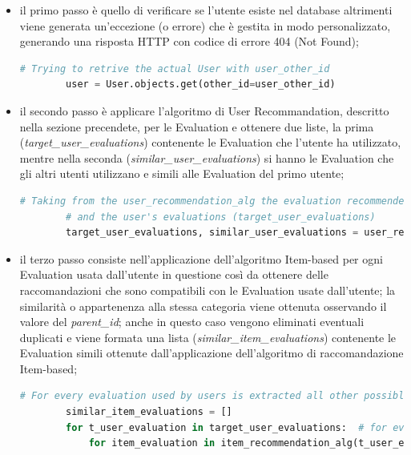 \begin{itemize}
    \item il primo passo è quello di verificare se l'utente esiste nel database altrimenti viene generata un’eccezione (o errore) che è gestita in 
    modo personalizzato, generando una risposta HTTP con codice di errore 404 (Not Found);
    \begin{lstlisting}[language=Python, label=lst:CF_Hybrid_Evaluation_2]
        # Trying to retrive the actual User with user_other_id
        user = User.objects.get(other_id=user_other_id)
    \end{lstlisting} 
    \item il secondo passo è applicare l'algoritmo di User Recommandation, descritto nella sezione precendete, per le Evaluation e ottenere due liste, 
    la prima (\textit{target\_user\_evaluations}) contenente le Evaluation che l'utente ha utilizzato, mentre nella seconda (\textit{similar\_user\_evaluations}) 
    si hanno le Evaluation che gli altri utenti utilizzano e simili alle Evaluation del primo utente;
    \begin{lstlisting}[language=Python, label=lst:CF_Hybrid_Evaluation_3]
        # Taking from the user_recommendation_alg the evaluation recommended from this approach (similar_user_evaluations)
        # and the user's evaluations (target_user_evaluations)
        target_user_evaluations, similar_user_evaluations = user_recommendation_alg(user_other_id)
    \end{lstlisting} 
    \item il terzo passo consiste nell'applicazione dell'algoritmo Item-based per ogni Evaluation usata dall'utente in questione così da ottenere 
    delle raccomandazioni che sono compatibili con le Evaluation usate dall'utente; la similarità o appartenenza alla stessa categoria viene 
    ottenuta osservando il valore del \textit{parent\_id}; anche in questo caso vengono eliminati eventuali duplicati e viene formata una lista 
    (\textit{similar\_item\_evaluations}) contenente le Evaluation simili ottenute dall'applicazione dell'algoritmo di raccomandazione Item-based;
    \begin{lstlisting}[language=Python, label=lst:CF_Hybrid_Evaluation_4]
        # For every evaluation used by users is extracted all other possible evaluations that have the same 'parent_id'
        similar_item_evaluations = []
        for t_user_evaluation in target_user_evaluations:  # for every target user's evaluations
            for item_evaluation in item_recommendation_alg(t_user_evaluation['other_id']):  # is applied the item_recommendation algorithm

\end{lstlisting}
\end{itemize}
